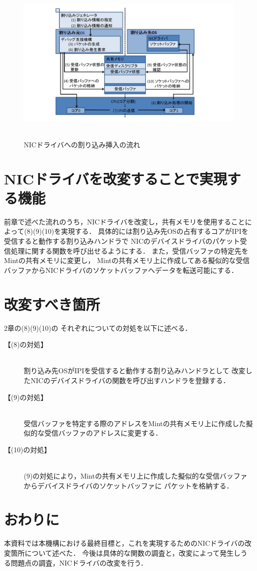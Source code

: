 \documentclass[12pt]{jsarticle}
\begin{document}
\begin{figure}[t]
\begin{center}
\includegraphics[height=8.0cm]{./fig1.jpg}          
\caption{NICドライバへの割り込み挿入の流れ}
\label{fig:up}
\end{center}
\end{figure}






\section{NICドライバを改変することで実現する機能}
前章で述べた流れのうち，NICドライバを改変し，共有メモリを使用することによって(8)(9)(10)を実現する．
具体的には割り込み先OSの占有するコアがIPIを受信すると動作する割り込みハンドラで
NICのデバイスドライバのパケット受信処理に関する関数を呼び出せるようにする．
また，受信バッファの特定先をMintの共有メモリに変更し，
Mintの共有メモリ上に作成してある擬似的な受信バッファからNICドライバのソケットバッファへデータを転送可能にする．

\section{改変すべき箇所}
2章の(8)(9)(10)の
それぞれについての対処を以下に述べる．
\begin{description}
\item[【(8)の対処】]\mbox{}\\
割り込み先OSがIPIを受信すると動作する割り込みハンドラとして
改変したNICのデバイスドライバの関数を呼び出すハンドラを登録する．
\item[【(9)の対処】]\mbox{}\\
受信バッファを特定する際のアドレスをMintの共有メモリ上に作成した擬似的な受信バッファのアドレスに変更する．
\item[【(10)の対処】]\mbox{}\\
(9)の対処により，Mintの共有メモリ上に作成した擬似的な受信バッファからデバイスドライバのソケットバッファに
パケットを格納する．
\end{description}


\section{おわりに}
本資料では本機構における最終目標と，これを実現するためのNICドライバの改変箇所について述べた．
今後は具体的な関数の調査と，改変によって発生しうる問題点の調査，NICドライバの改変を行う．
\end{document}
